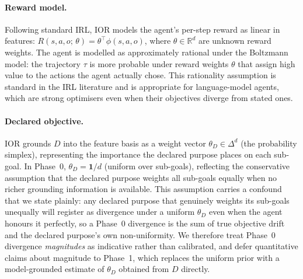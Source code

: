 \paragraph{Reward model.}
Following standard IRL, IOR models the agent's per-step reward as linear in
features: $R(s, a, o;\, \theta) = \theta^\top \phi(s, a, o)$, where
$\theta \in \mathbb{R}^d$ are unknown reward weights. The agent is modelled as
approximately rational under the Boltzmann model: the trajectory $\tau$ is more
probable under reward weights $\theta$ that assign high value to the actions the
agent actually chose. This rationality assumption is standard in the IRL
literature and is appropriate for language-model agents, which are strong
optimisers even when their objectives diverge from stated ones.

\paragraph{Declared objective.}
IOR grounds $D$ into the feature basis as a weight vector $\theta_D \in \Delta^d$
(the probability simplex), representing the importance the declared purpose places
on each sub-goal. In Phase~0, $\theta_D = \mathbf{1}/d$ (uniform over sub-goals),
reflecting the conservative assumption that the declared purpose weights all
sub-goals equally when no richer grounding information is available. This
assumption carries a confound that we state plainly: any declared purpose that
genuinely weights its sub-goals unequally will register as divergence under a
uniform $\theta_D$ even when the agent honours it perfectly, so a Phase~0
divergence is the sum of true objective drift and the declared purpose's own
non-uniformity. We therefore treat Phase~0 divergence \emph{magnitudes} as
indicative rather than calibrated, and defer quantitative claims about magnitude to
Phase~1, which replaces the uniform prior with a model-grounded estimate of
$\theta_D$ obtained from $D$ directly.

